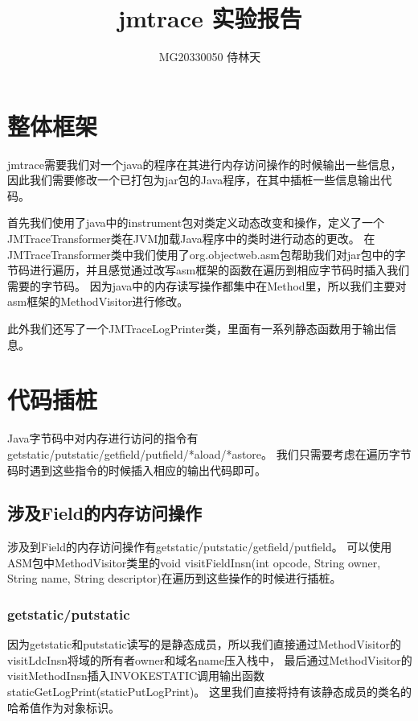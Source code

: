 \documentclass[UTF8]{article}
\begin{document}
\title{jmtrace 实验报告}

\author{MG20330050 侍林天}

\maketitle
\section{整体框架}
jmtrace需要我们对一个java的程序在其进行内存访问操作的时候输出一些信息，因此我们需要修改一个已打包为jar包的Java程序，在其中插桩一些信息输出代码。

首先我们使用了java中的instrument包对类定义动态改变和操作，定义了一个JMTraceTransformer类在JVM加载Java程序中的类时进行动态的更改。
在JMTraceTransformer类中我们使用了org.objectweb.asm包帮助我们对jar包中的字节码进行遍历，并且感觉通过改写asm框架的函数在遍历到相应字节码时插入我们需要的字节码。
因为java中的内存读写操作都集中在Method里，所以我们主要对asm框架的MethodVisitor进行修改。

此外我们还写了一个JMTraceLogPrinter类，里面有一系列静态函数用于输出信息。

\section{代码插桩}
Java字节码中对内存进行访问的指令有getstatic/putstatic/getfield/putfield/*aload/*astore。
我们只需要考虑在遍历字节码时遇到这些指令的时候插入相应的输出代码即可。

\subsection{涉及Field的内存访问操作}
涉及到Field的内存访问操作有getstatic/putstatic/getfield/putfield。
可以使用ASM包中MethodVisitor类里的void visitFieldInsn(int opcode, String owner, String name, String descriptor)在遍历到这些操作的时候进行插桩。

\subsubsection{getstatic/putstatic}
因为getstatic和putstatic读写的是静态成员，所以我们直接通过MethodVisitor的visitLdcInsn将域的所有者owner和域名name压入栈中，
最后通过MethodVisitor的visitMethodInsn插入INVOKESTATIC调用输出函数staticGetLogPrint(staticPutLogPrint)。
这里我们直接将持有该静态成员的类名的哈希值作为对象标识。
\end{document}
